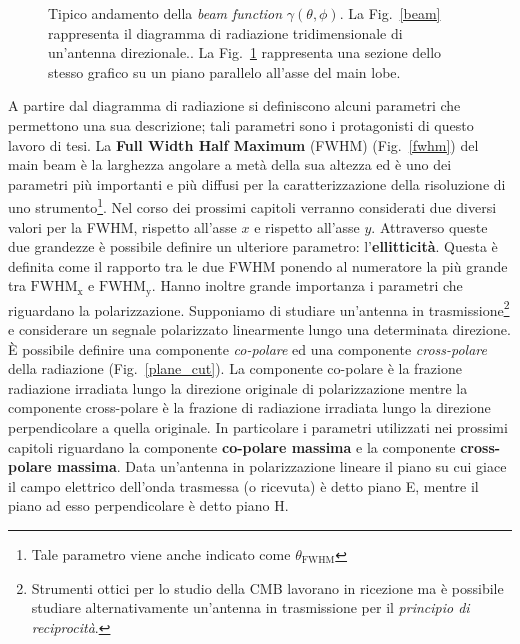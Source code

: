 \documentclass[12pt,a4paper,final]{book}
\begin{document}
\begin{figure}[!ht]
\begin{subfigure}{0.45\textwidth}
		\caption{}
		\label{beam_cut}
	\end{subfigure}
\caption{Tipico andamento della \textit{beam function} $\gamma(\theta,\phi)$. La Fig.~\ref{beam} rappresenta il diagramma di radiazione tridimensionale di un'antenna direzionale.\cite{cmb}. La Fig.~\ref{beam_cut} rappresenta una sezione dello stesso grafico su un piano parallelo all'asse del main lobe.\cite{planck}}
\label{diag_rad}
\end{figure}
A partire dal diagramma di radiazione si definiscono alcuni parametri che permettono una sua descrizione; tali parametri sono i protagonisti di questo lavoro di tesi.
La \textbf{Full Width Half Maximum} (FWHM) (Fig.~\ref{fwhm}) del main beam è la larghezza angolare a metà della sua altezza ed è uno dei parametri più importanti e più diffusi per la caratterizzazione della risoluzione di uno strumento\footnote{Tale parametro viene anche indicato come $\theta_\text{FWHM}$}. Nel corso dei prossimi capitoli verranno considerati due diversi valori per la FWHM, rispetto all'asse $x$ e rispetto all'asse $y$. Attraverso queste due grandezze è possibile definire un ulteriore parametro: l'\textbf{ellitticità}. Questa è definita come il rapporto tra le due FWHM ponendo al numeratore la più grande tra $\text{FWHM}_\text{x}$ e $\text{FWHM}_\text{y}$.
Hanno inoltre grande importanza i parametri che riguardano la polarizzazione. Supponiamo di studiare un'antenna in trasmissione\footnote{Strumenti ottici per lo studio della CMB lavorano in ricezione ma è possibile studiare alternativamente un'antenna in trasmissione per il \textit{principio di reciprocità}.} e considerare un segnale polarizzato linearmente lungo una determinata direzione.
\`E possibile definire una componente \textit{co-polare} ed una componente \textit{cross-polare} della radiazione (Fig.~\ref{plane_cut}). La componente co-polare è la frazione radiazione irradiata lungo la direzione originale di polarizzazione mentre la componente cross-polare è la frazione di radiazione irradiata lungo la direzione perpendicolare a quella originale.
In particolare i parametri utilizzati nei prossimi capitoli riguardano la componente \textbf{co-polare massima} e la componente \textbf{cross-polare massima}. Data un'antenna in polarizzazione lineare il piano su cui giace il campo elettrico dell'onda trasmessa (o ricevuta) è detto piano E, mentre il piano ad esso perpendicolare è detto piano H.
\end{document}

